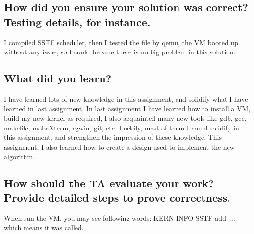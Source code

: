 \documentclass[10pt,draftclsnofoot,peerreview,letterpaper,onecolumn,]{IEEEtran}
\begin{document}
\subsection{How did you ensure your solution was correct? Testing details, for instance.}
I compiled SSTF scheduler, then I tested the file by qemu, the VM booted up without any issue, so I could be sure there is no big problem in this solution.

\subsection{What did you learn?}
I have learned lots of new knowledge in this assignment, and solidify what I have learned in last assignment. In last assignment I have learned how to install a VM, build my new kernel as required, I also acquainted many new tools like gdb, gcc, makefile, mobaXterm, cgwin, git, etc. Luckily, most of them I could solidify in this assignment, and strengthen the impression of these knowledge. This assignment, I also learned how to create a design used to implement the new algorithm.

\subsection{How should the TA evaluate your work? Provide detailed steps to prove correctness.}
When run the VM, you may see following words: KERN INFO SSTF add .... which means it was called.
\end{document}

